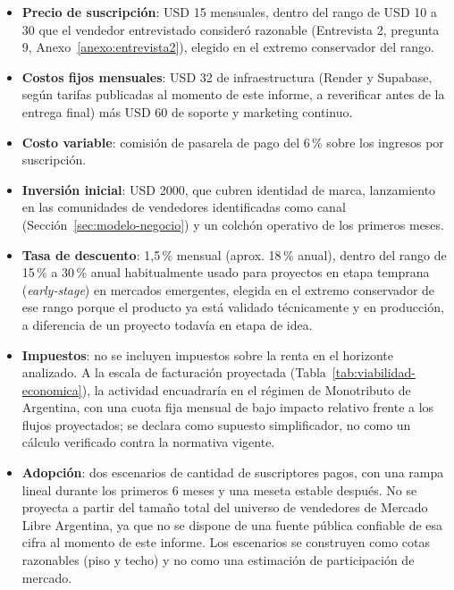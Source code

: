 \begin{itemize}
	\item \textbf{Precio de suscripción}: USD 15 mensuales, dentro del rango de USD 10 a 30 que el vendedor entrevistado consideró razonable (Entrevista 2, pregunta 9, Anexo~\ref{anexo:entrevista2}), elegido en el extremo conservador del rango.
	\item \textbf{Costos fijos mensuales}: USD 32 de infraestructura (Render y Supabase, según tarifas publicadas al momento de este informe, a reverificar antes de la entrega final) más USD 60 de soporte y marketing continuo.
	\item \textbf{Costo variable}: comisión de pasarela de pago del 6\,\% sobre los ingresos por suscripción.
	\item \textbf{Inversión inicial}: USD 2000, que cubren identidad de marca, lanzamiento en las comunidades de vendedores identificadas como canal (Sección~\ref{sec:modelo-negocio}) y un colchón operativo de los primeros meses.
	\item \textbf{Tasa de descuento}: 1,5\,\% mensual (aprox. 18\,\% anual), dentro del rango de 15\,\% a 30\,\% anual habitualmente usado para proyectos en etapa temprana (\emph{early-stage}) en mercados emergentes, elegida en el extremo conservador de ese rango porque el producto ya está validado técnicamente y en producción, a diferencia de un proyecto todavía en etapa de idea.
	\item \textbf{Impuestos}: no se incluyen impuestos sobre la renta en el horizonte analizado. A la escala de facturación proyectada (Tabla~\ref{tab:viabilidad-economica}), la actividad encuadraría en el régimen de Monotributo de Argentina, con una cuota fija mensual de bajo impacto relativo frente a los flujos proyectados; se declara como supuesto simplificador, no como un cálculo verificado contra la normativa vigente.
	\item \textbf{Adopción}: dos escenarios de cantidad de suscriptores pagos, con una rampa lineal durante los primeros 6 meses y una meseta estable después. No se proyecta a partir del tamaño total del universo de vendedores de Mercado Libre Argentina, ya que no se dispone de una fuente pública confiable de esa cifra al momento de este informe. Los escenarios se construyen como cotas razonables (piso y techo) y no como una estimación de participación de mercado.
\end{itemize}

